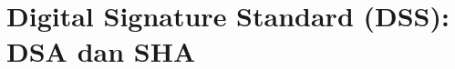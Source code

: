 \documentclass[../main.tex]{subfiles}
\begin{document}
\chapter{Digital Signature Standard (DSS): DSA dan SHA}
\end{document}
